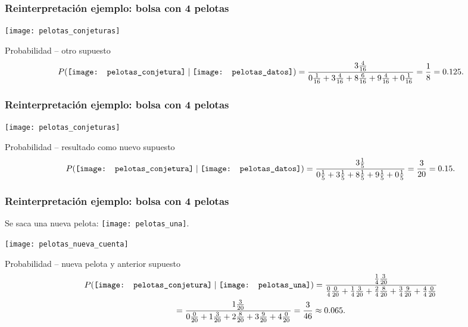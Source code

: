\documentclass[table]{beamer}
\begin{document}
\begin{frame}
    \frametitle{Reinterpretación ejemplo: bolsa con 4 pelotas}
    \begin{center}
        \texttt{[image: pelotas\_conjeturas]}
    \end{center}
    \begin{block}{Probabilidad -- otro supuesto}
        \begin{equation*}
            \prob{\texttt{[image: pelotas\_conjetura]} \mid
            \texttt{[image: pelotas\_datos]}} =
            \frac{3 \frac{4}{16}}{0 \frac{1}{16} + 3 \frac{4}{16} + 8 \frac{6}{16} + 9 \frac{4}{16} + 0 \frac{1}{16}}
            = \frac{1}{8} = 0.125 .
        \end{equation*}
    \end{block}
\end{frame}

\begin{frame}
    \frametitle{Reinterpretación ejemplo: bolsa con 4 pelotas}
    \begin{center}
        \texttt{[image: pelotas\_conjeturas]}
    \end{center}
    \begin{block}{Probabilidad -- resultado como nuevo supuesto}
        \begin{equation*}
            \prob{\texttt{[image: pelotas\_conjetura]} \mid
            \texttt{[image: pelotas\_datos]}} =
            \frac{3 \frac{1}{5}}{0 \frac{1}{5} + 3 \frac{1}{5} + 8 \frac{1}{5} + 9 \frac{1}{5} + 0 \frac{1}{5}}
            = \frac{3}{20} = 0.15 .
        \end{equation*}
    \end{block}
\end{frame}

\begin{frame}
    \frametitle{Reinterpretación ejemplo: bolsa con 4 pelotas}
    \begin{center}
        Se saca una nueva pelota:
        \texttt{[image: pelotas\_una]}.
    \end{center}
    \begin{center}
        \texttt{[image: pelotas\_nueva\_cuenta]}
    \end{center}
    \begin{block}{Probabilidad -- nueva pelota y anterior supuesto}
        \begin{multline*}
            \prob{\texttt{[image: pelotas\_conjetura]} \mid
            \texttt{[image: pelotas\_una]}} =
            \frac{\frac{1}{4} \frac{3}{20}}{\frac{0}{4} \frac{0}{20} + \frac{1}{4} \frac{3}{20} + \frac{2}{4} \frac{8}{20} + \frac{3}{4} \frac{9}{20} + \frac{4}{4} \frac{0}{20}} \\
            = \frac{1 \frac{3}{20}}{0 \frac{0}{20} + 1 \frac{3}{20} + 2 \frac{8}{20} + 3 \frac{9}{20} + 4 \frac{0}{20}}
            = \frac{3}{46} \approx 0.065 .
        \end{multline*}
    \end{block}
\end{frame}
\fi 
\end{document}
